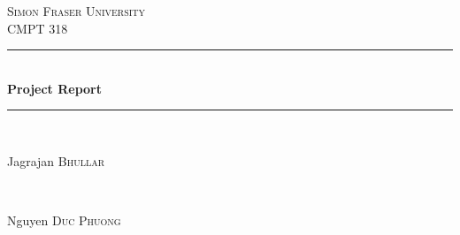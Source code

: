 \begin{titlepage}

\newcommand{\HRule}{\rule{\linewidth}{0.5mm}} %

\center %
 

\textsc{\LARGE Simon Fraser University}\\[1.5cm] %
\textsc{\Large CMPT 318}\\[0.5cm] %


\HRule \\[0.4cm]
{ \huge \bfseries Project Report}\\[0.4cm] %
\HRule \\[1.5cm]
 

\begin{minipage}{0.4\textwidth}
\begin{flushleft} \large
Jagrajan \textsc{Bhullar}
\end{flushleft}
\end{minipage}
~
\begin{minipage}{0.4\textwidth}
\begin{flushright} \large
Nguyen \textsc{Duc Phuong}
\end{flushright}
\end{minipage}\\[2cm]



\end{titlepage}
